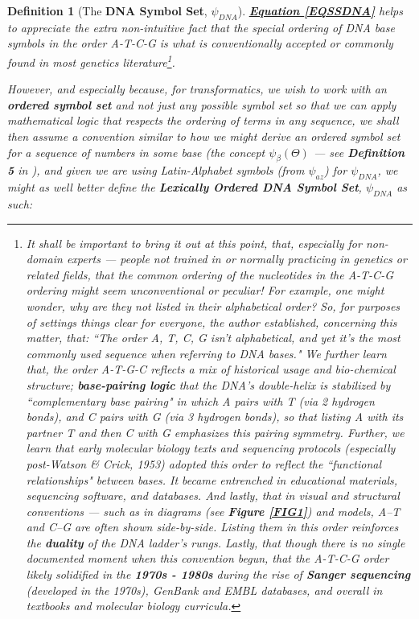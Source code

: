 \documentclass[a4paper, 18pt]{book} %
\newtheorem{defn}{Definition}
\begin{document}
{\begin{minipage}{0.9\textwidth}
\begin{defn}[The \textbf{DNA Symbol Set}, $\psi_{DNA}$]
\vspace{1em}

    \textbf{\hyperref[EQSSDNA]{Equation \ref{EQSSDNA}}} helps to appreciate the extra non-intuitive fact that the special ordering of DNA base symbols in the order A-T-C-G is what is conventionally accepted\cite{nature_atcg}\cite{wikipedia_nucleic_acid} or commonly found in most genetics literature\footnote{It shall be important to bring it out at this point, that, especially for non-domain experts --- people not trained in or normally practicing in genetics or related fields, that the common ordering of the nucleotides in the A-T-C-G ordering might seem unconventional or peculiar! For example, one might wonder, why are they not listed in their alphabetical order? So, for purposes of settings things clear for everyone, the author established\cite{copilot_dna_assistant}, concerning this matter, that: ``The order A, T, C, G isn't alphabetical, and yet it's the most commonly used sequence when referring to DNA bases." We further learn that, the order A-T-G-C reflects a mix of historical usage and bio-chemical structure; \textbf{base-pairing logic} that the DNA's double-helix is stabilized by ``complementary base pairing" in which A pairs with T (via 2 hydrogen bonds), and C pairs with G (via 3 hydrogen bonds), so that listing A with its partner T and then C with G emphasizes this pairing symmetry\cite{copilot_dna_assistant}. Further, we learn that early molecular biology texts and sequencing protocols (especially post-Watson \& Crick, 1953) adopted this order to reflect the ``functional relationships" between bases. It became entrenched in educational materials, sequencing software, and databases. And lastly, that in visual and structural conventions --- such as in diagrams (see \textbf{Figure \ref{FIG1}}) and models, A–T and C–G are often shown side-by-side. Listing them in this order reinforces the \textbf{duality} of the DNA ladder's rungs\cite{copilot_dna_assistant}. Lastly, that though there is no single documented moment when this convention begun, that the A-T-C-G order likely solidified in the \textbf{1970s - 1980s} during the rise of \textbf{Sanger sequencing} (developed in the 1970s), GenBank and EMBL databases, and overall in textbooks and molecular biology curricula.}.

However, and especially because, for transformatics, we wish to work with an \textbf{ordered symbol set}\cite{ossipaper} and not just \textit{any possible symbol set} so that we can apply mathematical logic that respects the ordering of terms in any sequence\cite{transformatics}, we shall then assume a convention similar to how we might derive an ordered symbol set for a sequence of numbers in some base (the concept $\psi_\beta(\Theta)$ --- see \textbf{Definition 5} in \cite{ossipaper}), and given we are using Latin-Alphabet symbols (from $\psi_{az}$\cite{transformatics}) for $\psi_{DNA}$, we might as well better define the \textbf{Lexically Ordered DNA Symbol Set}, $\psi_{DNA}$ as such:


\end{defn}
\end{minipage}}
\end{document}
